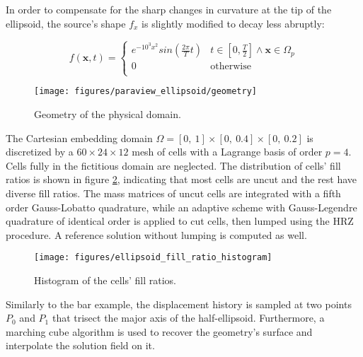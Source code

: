 In order to compensate for the sharp changes in curvature at the tip of the ellipsoid, the source's shape $f_x$ is slightly modified to decay less abruptly:

\begin{equation} \label{eq:ellipsoid_source}
f(\mathbf x,t) = \begin{cases}
e^{-10^3x^2} sin \left( \frac{2 \pi}{T} t \right) & t \in \left[ 0,\frac{T}{2} \right] \land \mathbf x \in \Omega_p \\[0.5em]
0 & \text{otherwise} \\
\end{cases}
\end{equation}

\begin{figure}[!h]
	\centering
	\hspace*{3cm}\texttt{[image: figures/paraview\_ellipsoid/geometry]}
	\caption{Geometry of the physical domain.}
	\label{ref:ellipsoid_geometry}
\end{figure}

The Cartesian embedding domain $\Omega = [0, \ 1] \times [0, \ 0.4] \times [0, \ 0.2]$ is discretized by a $60 \times  24 \times 12$ mesh of cells with a Lagrange basis of order $p=4$. Cells fully in the fictitious domain are neglected. The distribution of cells' fill ratios is shown in figure \ref{fig:ellipsoid_fill_ratio_histogram}, indicating that most cells are uncut and the rest have diverse fill ratios. The mass matrices of uncut cells are integrated with a fifth order Gauss-Lobatto quadrature, while an adaptive scheme with Gauss-Legendre quadrature of identical order is applied to cut cells, then lumped using the HRZ procedure. A reference solution without lumping is computed as well.

\begin{figure}[!h]
	\centering
	\texttt{[image: figures/ellipsoid\_fill\_ratio\_histogram]}
	\caption{Histogram of the cells' fill ratios.}
	\label{fig:ellipsoid_fill_ratio_histogram}
\end{figure}

Similarly to the bar example, the displacement history is sampled at two points $P_0$ and $P_1$ that trisect the major axis of the half-ellipsoid. Furthermore, a marching cube algorithm is used to recover the geometry's surface and interpolate the solution field on it.

